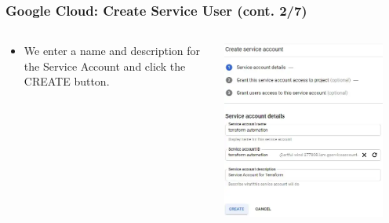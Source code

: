 \documentclass[aspectratio=169]{beamer}
\begin{document}
\begin{frame}
	\frametitle{Google Cloud: Create Service User (cont. 2/7)}
	\begin{columns}
		\begin{column}{0.5\textwidth}
			\begin{itemize}
				\item We enter a name and description for the Service Account and click the CREATE button.
			\end{itemize}
		\end{column}
		\begin{column}{0.5\textwidth}
			\begin{center}
				\includegraphics[width=0.9\textwidth]{../images/gcp-serv-acct2.png}
			\end{center}
		\end{column}
	\end{columns}
\end{frame}
\end{document}

